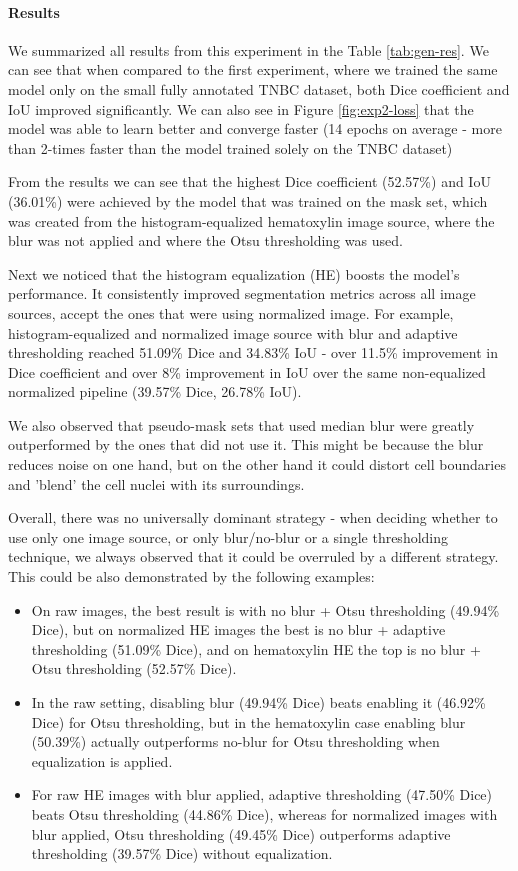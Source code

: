 \paragraph{Results}
We summarized all results from this experiment in the Table \ref{tab:gen-res}. We can see that when compared to the first experiment, where we trained the same model only on the small fully annotated TNBC dataset, both Dice coefficient and IoU improved significantly. We can also see in Figure \ref{fig:exp2-loss} that the model was able to learn better and converge faster (14 epochs on average - more than 2-times faster than the model trained solely on the TNBC dataset)

From the results we can see that the highest Dice coefficient (52.57\%) and IoU (36.01\%) were achieved by the model that was trained on the mask set, which was created from the histogram-equalized hematoxylin image source, where the blur was not applied and where the Otsu thresholding was used. 



Next we noticed that the histogram equalization (HE) boosts the model's performance. It consistently improved segmentation metrics across all image sources, accept the ones that were using normalized image. For example, histogram-equalized and normalized image source with blur and adaptive thresholding reached 51.09\% Dice and 34.83\% IoU - over 11.5\% improvement in Dice coefficient and over 8\% improvement in IoU over the same non-equalized normalized pipeline (39.57\% Dice, 26.78\% IoU).

We also observed that pseudo-mask sets that used median blur were greatly outperformed by the ones that did not use it. This might be because the blur reduces noise on one hand, but on the other hand it could distort cell boundaries and 'blend' the cell nuclei with its surroundings.

Overall, there was no universally dominant strategy - when deciding whether to use only one image source, or only blur/no-blur or a single thresholding technique, we always observed that it could be overruled by a different strategy. This could be also demonstrated by the following examples:

\begin{itemize}
    \item On raw images, the best result is with no blur + Otsu thresholding (49.94\% Dice), but on normalized HE images the best is no blur + adaptive thresholding (51.09\% Dice), and on hematoxylin HE the top is no blur + Otsu thresholding (52.57\% Dice).
    \item In the raw setting, disabling blur (49.94\% Dice) beats enabling it (46.92\% Dice) for Otsu thresholding, but in the hematoxylin case enabling blur (50.39\%) actually outperforms no-blur for Otsu thresholding when equalization is applied.
    \item For raw HE images with blur applied, adaptive thresholding (47.50\% Dice) beats Otsu thresholding (44.86\% Dice), whereas for normalized images with blur applied, Otsu thresholding (49.45\% Dice) outperforms adaptive thresholding (39.57\% Dice) without equalization.
\end{itemize}

